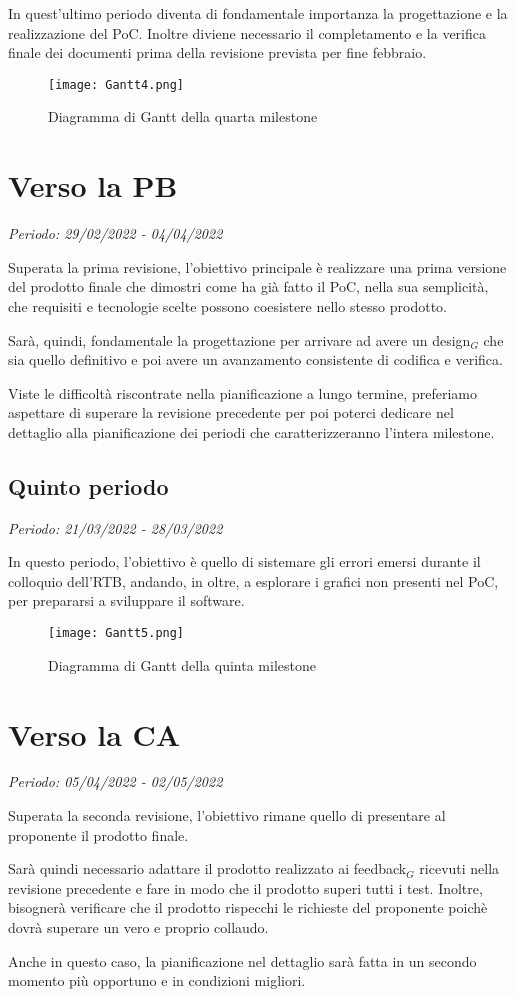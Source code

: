 In quest'ultimo periodo diventa di fondamentale importanza la progettazione e la realizzazione
 del PoC. Inoltre diviene necessario il completamento e la verifica finale dei documenti prima della revisione prevista 
 per fine febbraio.


\begin{figure}[!ht]
    \texttt{[image: Gantt4.png]}
    \caption{Diagramma di Gantt della quarta milestone} 
\end{figure}

\section{Verso la PB}

\textit{Periodo: 29/02/2022 - 04/04/2022}

Superata la prima revisione, l'obiettivo principale è realizzare una prima versione del prodotto finale che dimostri come ha già fatto il PoC, nella sua semplicità, 
che requisiti e tecnologie scelte possono coesistere nello stesso prodotto. 

Sarà, quindi, fondamentale la progettazione per arrivare ad avere un design$_G$ che sia quello definitivo e poi avere un avanzamento consistente di codifica e verifica.

Viste le difficoltà riscontrate nella pianificazione a lungo termine, preferiamo aspettare di superare la revisione precedente per poi poterci dedicare nel dettaglio
alla pianificazione dei periodi che caratterizzeranno l'intera milestone.

\subsection{Quinto periodo}
\textit{Periodo: 21/03/2022 - 28/03/2022}

In questo periodo, l'obiettivo è quello di sistemare gli errori emersi durante il colloquio dell'RTB, andando, in oltre, a esplorare i grafici non presenti nel PoC, per prepararsi a sviluppare il software.


\begin{figure}[!ht]
    \texttt{[image: Gantt5.png]}
    \caption{Diagramma di Gantt della quinta milestone} 
\end{figure}

\section{Verso la CA}

\textit{Periodo: 05/04/2022 - 02/05/2022}

Superata la seconda revisione, l'obiettivo rimane quello di presentare al proponente il prodotto finale.

Sarà quindi necessario adattare il prodotto realizzato ai feedback$_G$ ricevuti nella revisione precedente e fare in modo che il prodotto superi tutti i test. Inoltre, bisognerà
verificare che il prodotto rispecchi le richieste del proponente poichè dovrà superare un vero e proprio collaudo.

Anche in questo caso, la pianificazione nel dettaglio sarà fatta in un secondo momento più opportuno e in condizioni migliori.